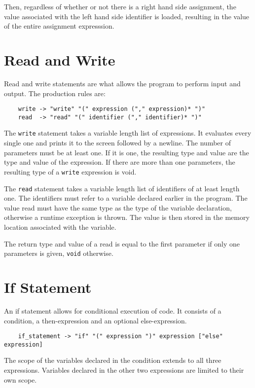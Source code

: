 \documentclass{report}
\begin{document}
Then, regardless of whether or not there is a right hand side
assignment, the value associated with the left hand side identifier
is loaded, resulting in the value of the entire assignment
expresssion.

\section{Read and Write}

Read and write statements are what allows the program to perform
input and output. The production rules are:
\begin{verbatim}
    write -> "write" "(" expression ("," expression)* ")"
    read  -> "read" "(" identifier ("," identifier)* ")"
\end{verbatim}

The \texttt{write} statement takes a variable length list of
expressions. It evaluates every single one and prints it to the
screen followed by a newline. The number of parameters must be at
least one. If it is one, the resulting type and value are the type
and value of the expression. If there are more than one parameters,
the resulting type of a \texttt{write} expression is void.

The \texttt{read} statement takes a variable length list of
identifiers of at least length one. The identifiers must refer to a
variable declared earlier in the program. The value read must have
the same type as the type of the variable declaration, otherwise a
runtime exception is thrown. The value is then stored in the memory
location associated with the variable.

The return type and value of a read is equal to the first parameter
if only one parameters is given, \texttt{void} otherwise.

\section{If Statement}

An if statement allows for conditional execution of code. It
consists of a condition, a then-expression and an optional
else-expression.
\begin{verbatim}
    if_statement -> "if" "(" expression ")" expression ["else" expression]
\end{verbatim}

The scope of the variables declared in the condition extends to all
three expressions. Variables declared in the other two expressions
are limited to their own scope.
\end{document}
